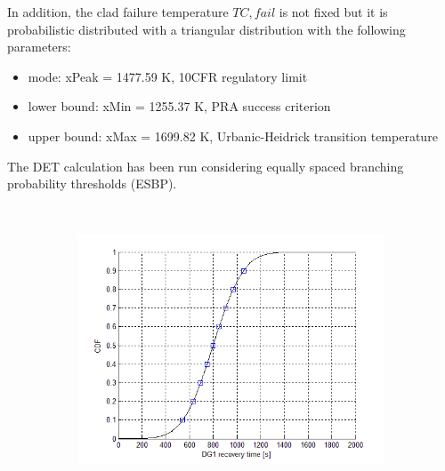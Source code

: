 In addition, the clad failure temperature $TC,fail$ is not fixed but it is probabilistic distributed with a triangular distribution with the following parameters:
\begin{itemize}
\item mode: xPeak = 1477.59 K, 10CFR regulatory limit
\item lower bound: xMin = 1255.37 K, PRA success criterion
\item upper bound: xMax = 1699.82 K, Urbanic-Heidrick transition temperature ~\cite{Urbanic1978}
\end{itemize}


The DET calculation has been run considering equally spaced branching probability thresholds (ESBP). 

\begin{figure}
        \centering %
        ~ %
        \begin{subfigure}[b]{0.48\textwidth}
                \centering
                \includegraphics[width=\textwidth]{figures/DG1Dist.png}
                \caption{}
                \label{fig:DG1Dist}
        \end{subfigure}
        \begin{subfigure}[b]{0.48\textwidth}
                \centering

\end{subfigure}
\end{figure}
